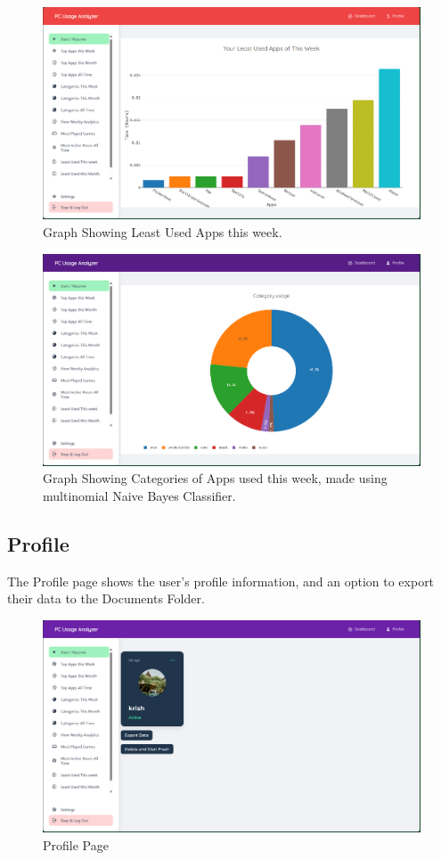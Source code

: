 \documentclass[openany]{report}
\begin{document}
\begin{figure}[H]
    \centering
    \includegraphics[width=.95\textwidth]{screenshots/least used.png}
    \caption{Graph Showing Least Used Apps this week. }
\end{figure}
\begin{figure}[H]
    \centering
    \includegraphics[width=.95\textwidth]{screenshots/categories.png}
    \caption{Graph Showing Categories of Apps used this week, made using multinomial Naive Bayes Classifier. }
\end{figure}

\subsection{Profile}
The Profile page shows the user's profile information, and an option to export their data to the Documents Folder.

\begin{figure}[H]
    \centering
    \includegraphics[width=.95\textwidth]{screenshots/profile.png}
    \caption{Profile Page}
\end{figure}
\end{document}
